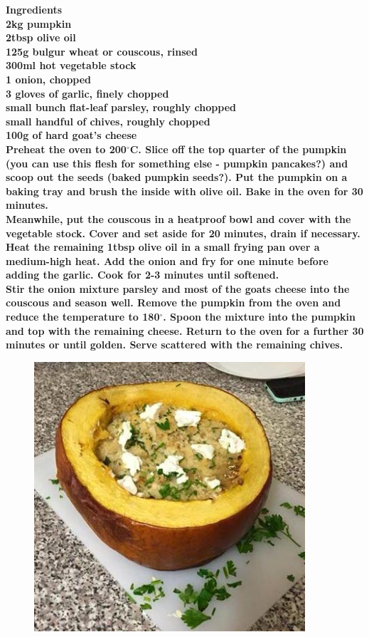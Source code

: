 \documentclass[18pt, oneside]{book}
\begin{document}
\bf{Ingredients} \normalfont \\
2kg pumpkin \\
2tbsp olive oil \\
125g bulgur wheat or couscous, rinsed \\
300ml hot vegetable stock \\
1 onion, chopped \\
3 gloves of garlic, finely chopped \\
small bunch flat-leaf parsley, roughly chopped \\
small handful of chives, roughly chopped \\
100g of hard goat's cheese \\

Preheat the oven to 200$^{\circ}$C. Slice off the top quarter of the pumpkin (you can use this flesh for something else - pumpkin pancakes?) and scoop out the seeds (baked pumpkin seeds?). Put the pumpkin on a baking tray and brush the inside with olive oil. Bake in the oven for 30 minutes. \\

Meanwhile, put the couscous in a heatproof bowl and cover with the vegetable stock. Cover and set aside for 20 minutes, drain if necessary. \\

Heat the remaining 1tbsp olive oil in a small frying pan over a medium-high heat. Add the onion and fry for one minute before adding the garlic. Cook for 2-3 minutes until softened. \\

Stir the onion mixture parsley and most of the goats cheese into the couscous and season well. Remove the pumpkin from the oven and reduce the temperature to 180$^{\circ}$. Spoon the mixture into the pumpkin and top with the remaining cheese. Return to the oven for a further 30 minutes or until golden. Serve scattered with the remaining chives. \\

\begin{figure}[h!]
  \begin{center}
  \includegraphics[height = 10cm]{bakedpumpkin}
  \end{center}
\end{figure}
\end{document}
